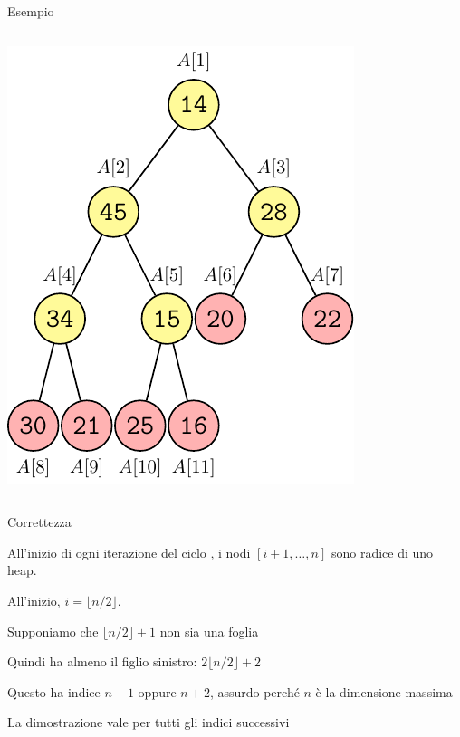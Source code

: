 \begin{frame}{Esempio}
\begin{columns}[T]
\begin{overprint}
\includegraphics[width=\textwidth,page=10]{heapbuild.pdf}
\end{overprint}
\end{columns}

\end{frame}

\begin{frame}{Correttezza}

\vspace{-9pt}
%
\begin{myboxtitle}
All'inizio di ogni iterazione del ciclo \FOR, i nodi $[i+1, \ldots, n]$ sono radice di uno heap.
\end{myboxtitle}


\begin{myboxtitle}
\BIL
\item All'inizio, $i= \lfloor n/2 \rfloor$. 
\item Supponiamo che $\lfloor n/2 \rfloor+1$ non sia una foglia
\item Quindi ha almeno il figlio sinistro: $2\lfloor n/2 \rfloor+2$
\item Questo ha indice $n+1$ oppure $n+2$, assurdo perché $n$ è la dimensione
massima
\item La dimostrazione vale per tutti gli indici successivi
\EIL 
\end{myboxtitle}



\end{frame}

